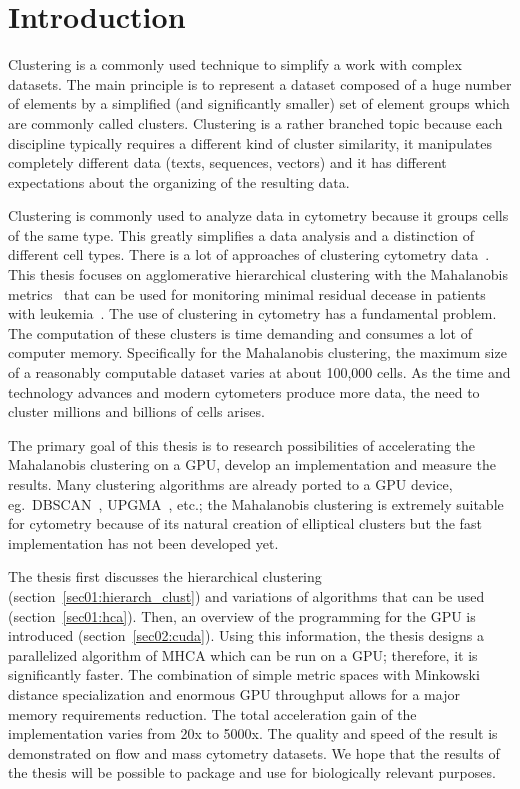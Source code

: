 \chapter*{Introduction}

Clustering is a commonly used technique to simplify a work with complex data\-sets.
The main principle is to represent a dataset composed of a huge number of elements by a simplified (and significantly smaller) set of element groups which are commonly called clusters.
Clustering is a rather branched topic because each discipline typically requires a different kind of cluster similarity, it manipulates completely different data (texts, sequences, vectors) and it has different expectations about the organizing of the resulting data.

Clustering is commonly used to analyze data in cytometry because it groups cells of the same type. This greatly simplifies a data analysis and a distinction of different cell types. There is a lot of approaches of clustering cytometry data~\cite{lo2008automated,ge2012flowpeaks,zeng2007feature}. This thesis focuses on agglomerative hierarchical clustering with the Mahalanobis metrics~\cite{mahalanobis1936generalized} that can be used for monitoring minimal residual decease in patients with leukemia~\cite{fivser2012detection}. The use of clustering in cytometry has a fundamental problem. The computation of these clusters is time demanding and consumes a lot of computer memory. Specifically for the Mahalanobis clustering, the maximum size of a reasonably computable dataset varies at about 100,000 cells. As the time and technology advances and modern cytometers produce more data, the need to cluster millions and billions of cells arises.

The primary goal of this thesis is to research possibilities of accelerating the Mahalanobis clustering on a GPU, develop an implementation and measure the results. Many clustering algorithms are already ported to a GPU device, eg.~DBSCAN~\cite{andrade2013g}, UPGMA~\cite{hua2017mgupgma}, etc.; the Mahalanobis clustering is extremely suitable for cytometry because of its natural creation of elliptical clusters but the fast implementation has not been developed yet.

The thesis first discusses the hierarchical clustering (section~\ref{sec01:hierarch_clust}) and variations of algorithms that can be used (section~\ref{sec01:hca}). Then, an overview of the programming for the GPU is introduced (section~\ref{sec02:cuda}). Using this information, the thesis designs a parallelized algorithm of MHCA which can be run on a GPU; therefore, it is significantly faster. The combination of simple metric spaces with Minkowski distance specialization and enormous GPU throughput allows for a major memory requirements reduction. The total acceleration gain of the implementation varies from 20x to 5000x. The quality and speed of the result is demonstrated on flow and mass cytometry datasets. We hope that the results of the thesis will be possible to package and use for biologically relevant purposes.


